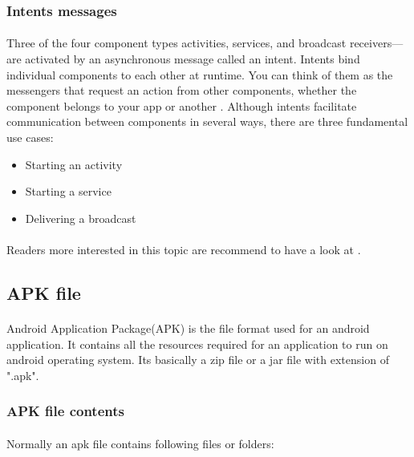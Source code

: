 \documentclass[../main.tex]{subfile}
\begin{document}
		\subsubsection{Intents messages}\label{sec:intents}
			\paragraph{} Three of the four component types activities, services, and broadcast receivers—are activated by an asynchronous message called an intent. Intents bind individual components to each other at runtime. You can think of them as the messengers that request an action from other components, whether the component belongs to your app or another \cite{app_fundamentals}. Although intents facilitate communication between components in several ways, there are three fundamental use cases:
				\begin{itemize}
					\item Starting an activity
					\item Starting a service
					\item Delivering a broadcast
				\end{itemize}
			\paragraph{} Readers more interested in this topic are recommend to have a look at \cite{intents}.
			
			
	\subsection{APK file}\label{sec:apk}	
		\paragraph{} Android Application Package(APK) is the file format used for an android application. It contains all the resources required for an application to run on android operating system. Its basically a zip file or a jar file with extension of ".apk"\cite{APK_structure}.
		
		\subsubsection{APK file contents} \label{sec:apk_file_contents}
		\paragraph{} Normally an apk file contains following files or folders:
		
\end{document}
